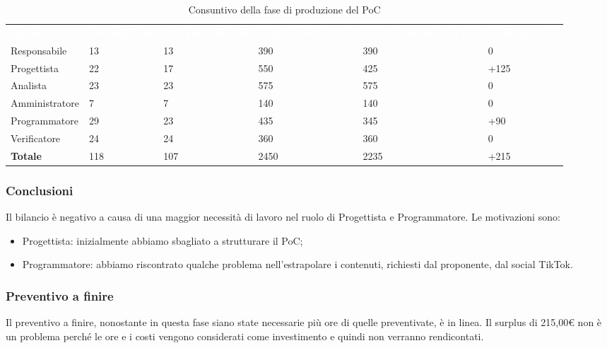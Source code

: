 \begin{table}[H]
\begin{center}
\renewcommand{\arraystretch}{1.5}
\begin{tabular}{ m{}<{\centering}  m{}<{\centering} m{}<{\centering} m{}<{\centering} m{}<{\centering} m{}<{\centering}}
	\rowcolor{darkblue}
	\textcolor{white}{\textbf{Ruolo}} & \textcolor{white}{\textbf{Ore Effettive}} & \textcolor{white}{\textbf{Ore Preventivate}}&\textcolor{white}{\textbf{Costo Effettivo (\euro) }}&\textcolor{white}{\textbf{Costo Preventivato (\euro)}}&\textcolor{white}{\textbf{Differenza (\euro)}}\\ 
	Responsabile  & 13 & 13 & 390 & 390 & 0\\	
	
	Progettista & 22 & 17 & 550 & 425 & +125\\
	
	Analista & 23 & 23 & 575 & 575 & 0\\
	
	Amministratore & 7 & 7 & 140 & 140 & 0\\
	
	Programmatore & 29 & 23 & 435 & 345 &  +90\\
	
	Verificatore & 24 & 24 & 360 & 360 & 0\\
	
	\textbf{Totale} & 118 & 107 & 2450 & 2235 & +215\\
	
\end{tabular}
\caption{Consuntivo della fase di produzione del PoC}
\end{center}
\end{table}

\subsubsection{Conclusioni}
Il bilancio è negativo a causa di una maggior necessità di lavoro nel ruolo di Progettista e Programmatore. Le motivazioni sono:
\begin{itemize}
\item Progettista: inizialmente abbiamo sbagliato a strutturare il PoC;
\item Programmatore: abbiamo riscontrato qualche problema nell'estrapolare i contenuti, richiesti dal proponente, dal social TikTok.
\end{itemize}

\subsubsection{Preventivo a finire}
Il preventivo a finire, nonostante in questa fase siano state necessarie più ore di quelle preventivate, è in linea. Il surplus di 215,00\euro \xspace non è un problema perché le ore e i costi vengono considerati come investimento e quindi non verranno rendicontati.